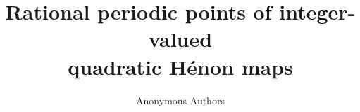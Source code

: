 \documentclass[11pt]{article}
\title{Rational periodic points of integer-valued\protect\\quadratic H\'enon maps}
\author{Anonymous Authors}
\date{}
\begin{document}
\maketitle
\begin{abstract}

\end{abstract}








\clearpage
\appendix




\end{document}
